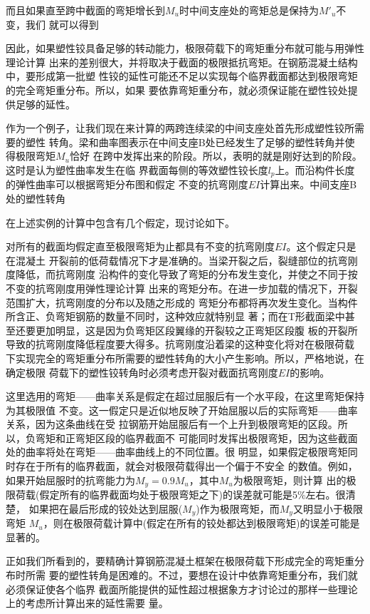 \documentclass[12pt,a4paper]{book}
\begin{document}
而且如果直至跨中截面的弯矩增长到$M_u$时中间支座处的弯矩总是保持为$M'_u$不变，我们
就可以得到

因此，如果塑性铰具备足够的转动能力，极限荷载下的弯矩重分布就可能与用弹性理论计算
出来的差别很大，并将取决于截面的极限抵抗弯矩。在钢筋混凝土结构中，要形成第一批塑
性铰的延性可能还不足以实现每个临界截面都达到极限弯矩的完全弯矩重分布。所以，如果
要依靠弯矩重分布，就必须保证能在塑性铰处提供足够的延性。

作为一个例子，让我们现在来计算的两跨连续梁的中间支座处首先形成塑性铰所需要的塑性
转角。梁和曲率图表示在中间支座B处已经发生了足够的塑性转角并使得极限弯矩$M_u$恰好
在跨中发挥出来的阶段。所以，表明的就是刚好达到的阶段。这时是认为塑性曲率发生在临
界截面每侧的等效塑性铰长度$l_p$上。而沿构件长度的弹性曲率可以根据弯矩分布图和假定
不变的抗弯刚度$EI$计算出来。中间支座B处的塑性转角

在上述实例的计算中包含有几个假定，现讨论如下。

对所有的截面均假定直至极限弯矩为止都具有不变的抗弯刚度$EI$。这个假定只是在混凝土
开裂前的低荷载情况下才是准确的。当梁开裂之后，裂缝部位的抗弯刚度降低，而抗弯刚度
沿构件的变化导致了弯矩的分布发生变化，并使之不同于按不变的抗弯刚度用弹性理论计算
出来的弯矩分布。在进一步加载的情况下，开裂范围扩大，抗弯刚度的分布以及随之形成的
弯矩分布都将再次发生变化。当构件所含正、负弯矩钢筋的数量不同时，这种效应就特别显
著；而在T形截面梁中甚至还要更加明显，这是因为负弯矩区段翼缘的开裂较之正弯矩区段腹
板的开裂所导致的抗弯刚度降低程度要大得多。抗弯刚度沿着梁的这种变化将对在极限荷载
下实现完全的弯矩重分布所需要的塑性转角的大小产生影响。所以，严格地说，在确定极限
荷载下的塑性铰转角时必须考虑开裂对截面抗弯刚度$EI$的影响。

这里选用的弯矩——曲率关系是假定在超过屈服后有一个水平段，在这里弯矩保持为其极限值
不变。这一假定只是近似地反映了开始屈服以后的实际弯矩——曲率关系，因为这条曲线在受
拉钢筋开始屈服后有一个上升到极限弯矩的区段。所以，负弯矩和正弯矩区段的临界截面不
可能同时发挥出极限弯矩，因为这些截面处的曲率将处在弯矩——曲率曲线上的不同位置。很
明显，如果假定极限弯矩同时存在于所有的临界截面，就会对极限荷载得出一个偏于不安全
的数值。例如，如果开始屈服时的抗弯能力为$M_y=0.9M_u$，其中$M_u$为极限弯矩，则计算
出的极限荷载(假定所有的临界截面均处于极限弯矩之下)的误差就可能是5\%左右。很清楚，
如果把在最后形成的铰处达到屈服($M_y$)作为极限弯矩，而$M_y$又明显小于极限弯矩
$M_u$，则在极限荷载计算中(假定在所有的铰处都达到极限弯矩)的误差可能是显著的。

正如我们所看到的，要精确计算钢筋混凝土框架在极限荷载下形成完全的弯矩重分布时所需
要的塑性转角是困难的。不过，要想在设计中依靠弯矩重分布，我们就必须保证使各个临界
截面所能提供的延性超过根据象方才讨论过的那样一些理论上的考虑所计算出来的延性需要
量。
\end{document}
